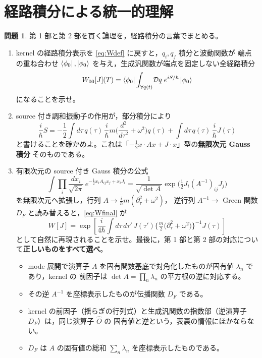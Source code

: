 \documentclass[dvipdfmx, uplatex]{jsarticle}
\theoremstyle{definition}
\newtheorem{prob}{問題}
\begin{document}
\section{経路積分による統一的理解}

\begin{prob}\label{prob:unified}
第 1 部と第 2 部を貫く論理を，経路積分の言葉でまとめる。
\begin{enumerate}
\item kernel の経路積分表示を \eqref{eq:Wdef} に戻すと，$q_i,q_f$ 積分と波動関数が
端点の重ね合わせ $\bra{\phi_0},\ket{\phi_0}$ を与え，生成汎関数が端点を固定しない全経路積分
\[
    W_{00}[J](T)=\bra{\phi_0}\int_{\forall q(t)}\!\mathcal{D}q\;e^{iS/\hbar}\ket{\phi_0}
\]
になることを示せ。
\item source 付き調和振動子の作用が，部分積分により
\[
    \frac{i}{\hbar}S
    =-\frac12\int d\tau\,q(\tau)\,\frac{i}{\hbar}m\Big(\frac{d^2}{d\tau^2}+\omega^2\Big)q(\tau)
    +\int d\tau\,q(\tau)\,\frac{i}{\hbar}J(\tau)
\]
と書けることを確かめよ。これは「$-\frac12 x\!\cdot\!Ax+J\!\cdot\!x$」型の\textbf{無限次元 Gauss 積分}
そのものである。
\item 有限次元の source 付き Gauss 積分の公式
\[
    \int\prod_i\frac{dx_i}{\sqrt{2\pi}}\,e^{-\frac12 x_iA_{ij}x_j+x_iJ_i}
    =\frac{1}{\sqrt{\det A}}\exp\!\Big(\tfrac12 J_i(A^{-1})_{ij}J_j\Big)
\]
を無限次元へ拡張し，行列 $A\to\frac{i}{\hbar}m(\partial_\tau^2+\omega^2)$，
逆行列 $A^{-1}\to$ Green 関数 $D_F$ と読み替えると，\eqref{eq:Wfinal} が
\[
    W[J]=\exp\!\left[\frac{i}{4\hbar}\int d\tau\,d\tau'\,J(\tau')
    \Big\{\tfrac{m}{2}\big(\partial_\tau^2+\omega^2\big)\Big\}^{-1}J(\tau)\right]
\]
として自然に再現されることを示せ。最後に，第 1 部と第 2 部の対応について\textbf{正しいものをすべて選べ}。
\begin{itemize}\setlength{\itemsep}{1pt}
\item[(あ)] mode 展開で演算子 $A$ を固有関数基底で対角化したものが固有値 $\lambda_n$ であり，kernel の
前因子は $\det A=\prod_n\lambda_n$ の平方根の逆に対応する。
\item[(い)] その逆 $A^{-1}$ を座標表示したものが伝播関数 $D_F$ である。
\item[(う)] kernel の前因子（揺らぎの行列式）と生成汎関数の指数部（逆演算子 $D_F$）は，同じ演算子 $\hat O$ の
固有値と逆という，表裏の情報にほかならない。
\item[(え)] $D_F$ は $A$ の固有値の総和 $\sum_n\lambda_n$ を座標表示したものである。
\end{itemize}
\end{enumerate}
\end{prob}
\end{document}
